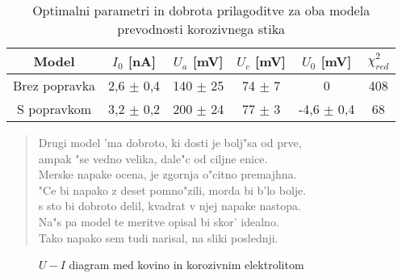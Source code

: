 \documentclass[a4paper,10pt]{article}
\begin{document}
\begin{table}[h]
 \centering
\begin{tabular}{|c|c|c|c|c|c|}
\hline
Model & $I_0$ [nA] & $U_a$ [mV] & $U_c$ [mV] & $U_0$ [mV] & $\chi^2_{red}$ \\
\hline
Brez popravka & 2,6 $\pm$ 0,4 & 140 $\pm$ 25 & 74 $\pm$ 7 & 0 & 408 \\
S popravkom & 3,2 $\pm$ 0,2 & 200 $\pm$ 24 & 77 $\pm$ 3 & -4,6 $\pm$ 0,4 & 68 \\
\hline
\end{tabular}
\caption{Optimalni parametri in dobrota prilagoditve za oba modela prevodnosti korozivnega stika}
\end{table}

\begin{verse}
 Drugi model 'ma dobroto, ki dosti je bolj"sa od prve, \\
 ampak "se vedno velika, dale"c od ciljne enice. \\
 Merske napake ocena, je zgornja o"citno premajhna. \\
 "Ce bi napako z deset pomno"zili, morda bi b'lo bolje. \\
 s sto bi dobroto delil, kvadrat v njej napake nastopa. \\
 Na"s pa model te meritve opisal bi skor' idealno. \\
 Tako napako sem tudi narisal, na sliki poslednji. 
\end{verse}

\begin{figure}[h]
 
 \caption{$U-I$ diagram med kovino in korozivnim elektrolitom}
 \label{fig:korozija}
\end{figure}
\end{document}
